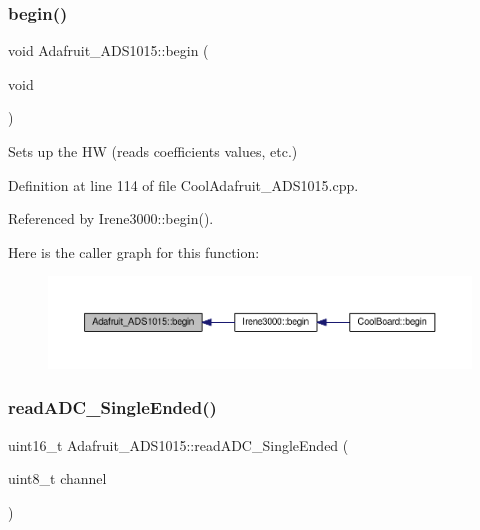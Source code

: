 \subsubsection{\texorpdfstring{begin()}{begin()}}
{\footnotesize\ttfamily void Adafruit\+\_\+\+A\+D\+S1015\+::begin (\begin{DoxyParamCaption}\item[{void}]{ }\end{DoxyParamCaption})}



Sets up the HW (reads coefficients values, etc.) 



Definition at line 114 of file Cool\+Adafruit\+\_\+\+A\+D\+S1015.\+cpp.



Referenced by Irene3000\+::begin().

Here is the caller graph for this function\+:\nopagebreak
\begin{figure}[H]
\begin{center}
\leavevmode
\includegraphics[width=350pt]{df/df6/class_adafruit___a_d_s1015_a6eba7c3cd854927f60883bb371e5faa6_icgraph}
\end{center}
\end{figure}
\mbox{\label{class_adafruit___a_d_s1015_a40f38b9e1f3ec397c0670dd632510235}} 
\subsubsection{\texorpdfstring{read\+A\+D\+C\+\_\+\+Single\+Ended()}{readADC\_SingleEnded()}}
{\footnotesize\ttfamily uint16\+\_\+t Adafruit\+\_\+\+A\+D\+S1015\+::read\+A\+D\+C\+\_\+\+Single\+Ended (\begin{DoxyParamCaption}\item[{uint8\+\_\+t}]{channel }\end{DoxyParamCaption})}



